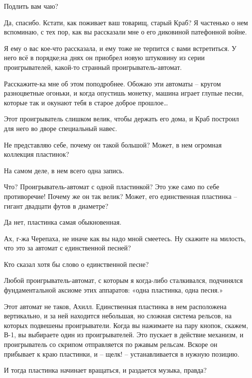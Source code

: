 \documentclass[../main.tex]{subfiles}
\begin{document}
\begin{dialogue}
 Подлить вам чаю?

 Да, спасибо. Кстати, как поживает ваш товарищ, старый Краб? Я частенько о нем вспоминаю, с тех пор, как вы рассказали мне о его диковиной патефонной войне.

 Я ему о вас кое-что рассказала, и ему тоже не терпится с вами встретиться. У него всё в порядке;на днях он приобрел новую штуковину из серии проигрывателей, какой-то странный проигрыватель-автомат.

 Расскажите-ка мне об этом поподробнее. Обожаю эти автоматы \--- кругом разноцветные огоньки, и когда опустишь монетку, машина играет глупые песни, которые так и окунают тебя в старое доброе прошлое\ldots{}

 Этот проигрыватель слишком велик, чтобы держать его дома, и Краб построил для него во дворе специальный навес.

 Не представляю себе, почему он такой большой? Может, в нем огромная коллекция пластинок?

 На самом деле, в нем всего одна запись.

 Что? Проигрыватель-автомат с одной пластинкой? Это уже само по себе противоречие! Почему же он так велик? Может, его единственная пластинка \--- гигант двадцати футов в диаметре?

 Да нет, пластинка самая обыкновенная.

 Ах, г-жа Черепаха, не иначе как вы надо мной смеетесь. Ну скажите на милость, что это за автомат с единственной песней?

 Кто сказал хотя бы слово о единственной песне?

 Любой проигрыватель-автомат, с которым я когда-либо сталкивался, подчинялся фундаментальной аксиоме этих аппаратов: «одна пластинка, одна песня.»

 Этот автомат не таков, Ахилл. Единственная пластинка в нем расположена вертикально, и за ней находится небольшая, но сложная система рельсов, на которых подвешены проигрыватели. Когда вы нажимаете на пару кнопок, скажем, \mbox{В-1}, вы выбираете один из проигрывателей. Это пускает в действие механизм, и проигрыватель со скрипом отправляется по ржавым рельсам. Вскоре он прибывает к краю пластинки, и \--- щелк! \--- устанавливается в нужную позицию.

 И тогда пластинка начинает вращаться, и раздается музыка, правда?


\end{dialogue}
\end{document}
